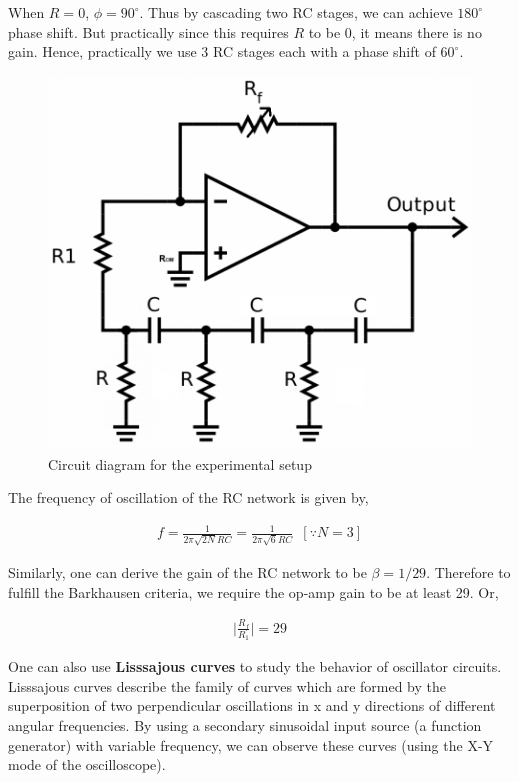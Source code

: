 When $R=0$, $\phi=90^{\circ}$. Thus by cascading two RC stages, we can achieve $180^{\circ}$ phase shift. But practically since this requires $R$ to be 0, it means there is no gain. Hence, practically we use 3 RC stages each with a phase shift of $60^{\circ}$.

\begin{figure}[H]
    \centering
    \includegraphics[width=0.7\columnwidth]{images/circuit2.png}
    \caption{Circuit diagram for the experimental setup}
    \label{circuit}
\end{figure}

The frequency of oscillation of the RC network is given by,

\begin{align}
    f = \frac{1}{2 \pi \sqrt{2N} RC} = \frac{1}{2\pi\sqrt{6}RC}\,\,\,[\because N=3] \label{freq}
\end{align}

Similarly, one can derive the gain of the RC network to be $\beta = 1/29$. Therefore to fulfill the Barkhausen criteria, we require the op-amp gain to be at least 29. Or,

\begin{align}
    \bigg|\frac{R_f}{R_1}\bigg| = 29 
\end{align}

One can also use \textbf{Lisssajous curves} to study the behavior of oscillator circuits. Lisssajous curves describe the family of curves which are formed by the superposition of two perpendicular oscillations in x and y directions of different angular frequencies. By using a secondary sinusoidal input source (a function generator) with variable frequency, we can observe these curves (using the X-Y mode of the oscilloscope).

